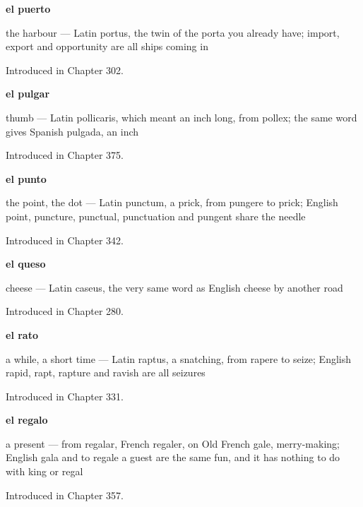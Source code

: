 \noindent\begin{minipage}[t]{\linewidth}
\raggedright
\textbf{el puerto}\par
\small the harbour — Latin portus, the twin of the porta you already have; import, export and opportunity are all ships coming in\par
\footnotesize Introduced in Chapter 302.
\end{minipage}\par\medskip

\noindent\begin{minipage}[t]{\linewidth}
\raggedright
\textbf{el pulgar}\par
\small thumb — Latin pollicaris, which meant an inch long, from pollex; the same word gives Spanish pulgada, an inch\par
\footnotesize Introduced in Chapter 375.
\end{minipage}\par\medskip

\noindent\begin{minipage}[t]{\linewidth}
\raggedright
\textbf{el punto}\par
\small the point, the dot — Latin punctum, a prick, from pungere to prick; English point, puncture, punctual, punctuation and pungent share the needle\par
\footnotesize Introduced in Chapter 342.
\end{minipage}\par\medskip

\noindent\begin{minipage}[t]{\linewidth}
\raggedright
\textbf{el queso}\par
\small cheese — Latin caseus, the very same word as English cheese by another road\par
\footnotesize Introduced in Chapter 280.
\end{minipage}\par\medskip

\noindent\begin{minipage}[t]{\linewidth}
\raggedright
\textbf{el rato}\par
\small a while, a short time — Latin raptus, a snatching, from rapere to seize; English rapid, rapt, rapture and ravish are all seizures\par
\footnotesize Introduced in Chapter 331.
\end{minipage}\par\medskip

\noindent\begin{minipage}[t]{\linewidth}
\raggedright
\textbf{el regalo}\par
\small a present — from regalar, French regaler, on Old French gale, merry-making; English gala and to regale a guest are the same fun, and it has nothing to do with king or regal\par
\footnotesize Introduced in Chapter 357.
\end{minipage}\par\medskip


